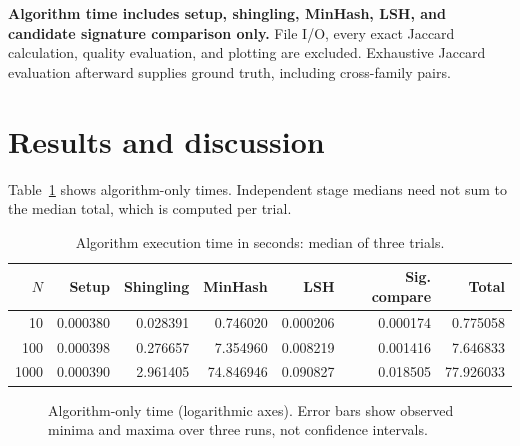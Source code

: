 \documentclass[11pt,a4paper]{article}
\begin{document}
\textbf{Algorithm time includes setup, shingling, MinHash, LSH, and
candidate signature comparison only.} File I/O, every exact Jaccard
calculation, quality evaluation, and plotting are excluded.
Exhaustive Jaccard evaluation afterward supplies ground truth, including
cross-family pairs.

\section{Results and discussion}
Table~\ref{tab:times} shows algorithm-only times. Independent stage
medians need not sum to the median total, which is computed per trial.

\begin{table}[htbp]
\centering\small
\caption{Algorithm execution time in seconds: median of three trials.}
\label{tab:times}
\begin{tabular}{@{}rrrrrrr@{}}
\toprule
$N$ & Setup & Shingling & MinHash & LSH & Sig. compare & Total \\
\midrule
10 & 0.000380 & 0.028391 & 0.746020 & 0.000206 & 0.000174 & 0.775058 \\
100 & 0.000398 & 0.276657 & 7.354960 & 0.008219 & 0.001416 & 7.646833 \\
1000 & 0.000390 & 2.961405 & 74.846946 & 0.090827 & 0.018505 & 77.926033 \\
\bottomrule
\end{tabular}
\end{table}

\begin{figure}[htbp]
\centering
{}
\caption{Algorithm-only time (logarithmic axes). Error bars show observed
minima and maxima over three runs, not confidence intervals.}
\label{fig:scaling}
\end{figure}
\end{document}
